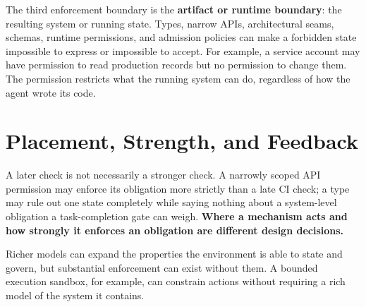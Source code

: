 

The third enforcement boundary is the \textbf{artifact or runtime boundary}: the resulting system or running state. Types, narrow APIs, architectural seams, schemas, runtime permissions, and admission policies can make a forbidden state impossible to express or impossible to accept. For example, a service account may have permission to read production records but no permission to change them. The permission restricts what the running system can do, regardless of how the agent wrote its code.

\section{Placement, Strength, and Feedback}\label{heading:placement-and-strength-are-different-decisions}



A later check is not necessarily a stronger check. A narrowly scoped API permission may enforce its obligation more strictly than a late CI check; a type may rule out one state completely while saying nothing about a system-level obligation a task-completion gate can weigh. \textbf{Where a mechanism acts and how strongly it enforces an obligation are different design decisions.}


Richer models can expand the properties the environment is able to state and govern, but substantial enforcement can exist without them. A bounded execution sandbox, for example, can constrain actions without requiring a rich model of the system it contains.

